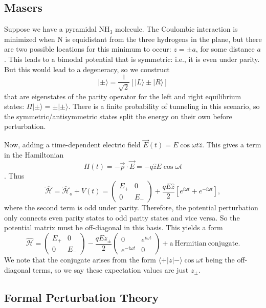 \documentclass[fontsize=12pt]{scrartcl}
\newcommand{\la}{\langle}
\newcommand{\ra}{\rangle}
\newcommand{\Ham}{\hat{\mathcal{H}}}
\begin{document}
\subsection{Masers}

Suppose we have a pyramidal NH$_3$ molecule. The Coulombic interaction is minimized when N is equidistant from the three hydrogens in the plane, but there are two possible locations for this minimum to occur: $z=\pm a$, for some distance $a$. This leads to a bimodal potential that is symmetric: i.e., it is even under parity. But this would lead to a degeneracy, so we construct $$|\pm\ra = \frac{1}{\sqrt{2}}\left[|L\ra \pm |R\ra\right]$$ that are eigenstates of the parity operator for the left and right equilibrium states: $\Pi|\pm\ra = \pm |\pm\ra$. There is a finite probability of tunneling in this scenario, so the symmetric/antisymmetric states split the energy on their own before perturbation.

Now, adding a time-dependent electric field $\vec{E}(t)=E\cos\omega t \hat{z}$. This gives a term in the Hamiltonian $$H(t)=-\vec{p}\cdot \vec{E}=-q\hat{z}E\cos\omega t$$. Thus $$\Ham=\Ham_o+V(t) = \left(\begin{matrix}
E_+&0\\0&E_-
\end{matrix}\right)+\frac{qE\hat{z}}{2}[e^{i\omega t}+e^{-i\omega t}],$$ where the second term is odd under parity. Therefore, the potential perturbation only connects even parity states to odd parity states and vice versa. So the potential matrix must be off-diagonal in this basis. This yields a form $$\Ham = \left(\begin{matrix}
E_+&0\\0&E_-
\end{matrix}\right)-\frac{qEz_\pm}{2}\left(\begin{matrix}
0&e^{i\omega t}\\e^{-i\omega t}&0
\end{matrix}\right) + \mathrm{a\ Hermitian\ conjugate.}$$ We note that the conjugate arises from the form $\la+|z|-\ra \cos\omega t$ being the off-diagonal terms, so we say these expectation values are just $z_\pm$.

\subsection{Formal Perturbation Theory}
\end{document}
